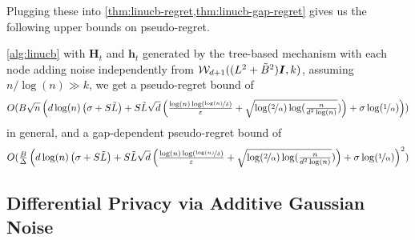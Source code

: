 \documentclass{article}
\renewcommand{\vec}[1]{\bm{#1}}
\newcommand{\Wishart}{\mathcal{W}}
\newcommand{\Eye}[1][]{\bm{I}\notblank{#1}{_{{#1}\times{#1}}}{}}
\begin{document}
\vspace{-\parskip} Plugging these into
\cref{thm:linucb-regret,thm:linucb-gap-regret} gives us the following
upper bounds on pseudo-regret.
\begin{corollary}
\label{cor:regret_with_Wishart}
\cref{alg:linucb} with $\vec H_t$ and $\vec h_t$ generated by the tree-based
mechanism with each node adding noise independently from
$\Wishart_{d+1}( (L^2+\tilde B^2)\Eye, k )$, assuming
$n/\log(n)\gg k$, we get a pseudo-regret bound of
\[ O(B\sqrt n\left( d\log(n)\left( \sigma+S\tilde{L} \right) +S\tilde{L}\sqrt d \left( \tfrac{\log(n)\log(\nicefrac{\log(n)}{\delta})}{\varepsilon} +\sqrt{\log(\nicefrac 2 \alpha)\log(\tfrac{n}{d^2\log(n)}}) \right) +\sigma\log(\nicefrac 1 \alpha) \right) )  \] in general, and a gap-dependent pseudo-regret bound of
\[ O(\tfrac B \Delta\left( d\log(n)\left( \sigma+S\tilde{L} \right) +S\tilde{L}\sqrt d \left( \tfrac{\log(n)\log(\nicefrac{\log(n)}{\delta})}{\varepsilon} +\sqrt{\log(\nicefrac 2 \alpha)\log(\tfrac{n}{d^2\log(n)}}) \right) +\sigma\log(\nicefrac 1 \alpha) \right)^2 ) \]
\end{corollary}

\subsection{Differential Privacy via Additive Gaussian Noise}
\label{sec:dp-gauss}
\end{document}
